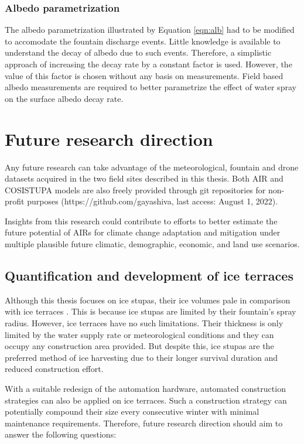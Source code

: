 \subsubsection{Albedo parametrization}

The albedo parametrization illustrated by Equation \ref{eqn:alb} had to be modified to accomodate the fountain
discharge events. Little knowledge is available to understand the decay of albedo due to such events. Therefore,
a simplistic approach of increasing the decay rate by a constant factor is used. However, the value of this
factor is chosen without any basis on measurements. Field based albedo measurements are required to better
parametrize the effect of water spray on the surface albedo decay rate.

\section{Future research direction}

Any future research can take advantage of the meteorological, fountain and drone datasets acquired in the two field
sites described in this thesis. Both AIR and COSISTUPA models are also freely provided through git repositories
for non-profit purposes (https://github.com/gayashiva, last access: August 1, 2022).

Insights from this research could contribute to efforts to better estimate the future potential of AIRs for
climate change adaptation and mitigation under multiple plausible future climatic, demographic, economic, and
land use scenarios.


\subsection{Quantification and development of ice terraces}

Although this thesis focuses on ice stupas, their ice volumes pale in comparison with ice terraces
\citep{nusserSociohydrologyArtificialGlaciers2019}. This is because ice stupas are limited by their fountain's
spray radius. However, ice terraces have no such limitations. Their thickness is only limited by the water
supply rate or meteorological conditions and they can occupy any construction area provided. But despite this, ice
stupas are the preferred method of ice harvesting due to their longer survival duration and reduced construction
effort.

With a suitable redesign of the automation hardware, automated construction strategies can also be applied on
ice terraces. Such a construction strategy can potentially compound their size every consecutive winter with
minimal maintenance requirements. Therefore, future research direction should aim to answer the following
questions:

